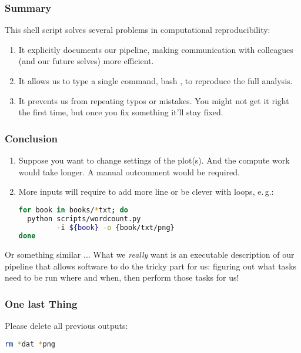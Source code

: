 \begin{frame}
  \frametitle{Summary}
  This  shell script solves several problems in computational reproducibility:
  \begin{enumerate}[<+->]
   \item It explicitly documents our pipeline, making communication with colleagues (and our future selves) more efficient.
   \item It allows us to type a single command, bash , to reproduce the full analysis.
   \item It prevents us from repeating typos or mistakes. You might not get it right the first time, but once you fix something it’ll stay fixed.
  \end{enumerate}
  \pause
\end{frame}

\begin{frame}[fragile]
  \frametitle{Conclusion}
  \begin{enumerate}[<+->]
   \item Suppose you want to change settings of the plot(s). And the compute work would take longer. A manual outcomment would be required.
   \item More inputs will require to add more line or be clever with loops, e.\,g.:
         \begin{lstlisting}[language=Bash, style=Shell]
for book in books/*txt; do 
  python scripts/wordcount.py 
         -i ${book} -o {book/txt/png}
done
         \end{lstlisting}
  \end{enumerate}
  Or something similar ...\newline
  What we \emph{really} want is an executable description of our pipeline that allows software to do the tricky part for us: figuring out what tasks need to be run where and when, then perform those tasks for us!
\end{frame}

\begin{frame}[fragile]
  \frametitle{One last Thing}
  Please delete all previous outputs:
  \begin{lstlisting}[language=Bash, style=Shell]
rm *dat *png 
  \end{lstlisting}
\end{frame}




